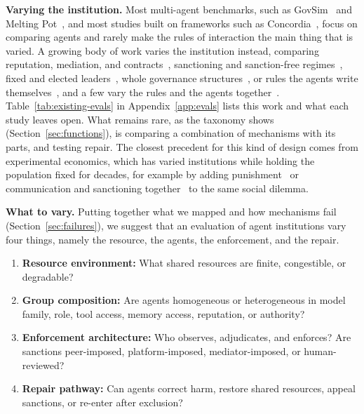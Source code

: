 \documentclass[runningheads]{llncs}
\begin{document}
\textbf{Varying the institution.} Most multi-agent benchmarks, such as GovSim~\mbox{\citep{piatti2024govsim}} and Melting Pot~\mbox{\citep{leibo2021meltingpot}}, and most studies built on frameworks such as Concordia~\mbox{\citep{vezhnevets2023concordia}}, focus on comparing agents and rarely make the rules of interaction the main thing that is varied. A growing body of work varies the institution instead, comparing reputation, mediation, and contracts~\mbox{\citep{tewolde2026coopevalbenchmarkingcooperationsustainingmechanisms}}, sanctioning and sanction-free regimes~\mbox{\citep{piedrahita2025corruptedreasoningreasoninglanguage}}, fixed and elected leaders~\mbox{\citep{faulkner2026evaluatingcooperationllmsocial}}, whole governance structures~\mbox{\citep{vedanta2026corrupt}}, or rules the agents write themselves~\mbox{\citep{rehm2026selfgovernance}}, and a few vary the rules and the agents together~\mbox{\citep{seyedin2026politician}}. Table~\mbox{\ref{tab:existing-evals}} in Appendix~\mbox{\ref{app:evals}} lists this work and what each study leaves open. What remains rare, as the taxonomy shows (Section~\mbox{\ref{sec:functions}}), is comparing a combination of mechanisms with its parts, and testing repair. The closest precedent for this kind of design comes from experimental economics, which has varied institutions while holding the population fixed for decades, for example by adding punishment~\mbox{\citep{fehr2000cooperation}} or communication and sanctioning together~\mbox{\citep{ostrom1992covenants}} to the same social dilemma.

\textbf{What to vary.} Putting together what we mapped and how mechanisms fail (Section~\mbox{\ref{sec:failures}}), we suggest that an evaluation of agent institutions vary four things, namely the resource, the agents, the enforcement, and the repair.

\begin{enumerate}[noitemsep,topsep=1pt,parsep=1pt,partopsep=0pt]
    \item \textbf{Resource environment:} What shared resources are finite, congestible, or degradable?
    \item \textbf{Group composition:} Are agents homogeneous or heterogeneous in model family, role, tool access, memory access, reputation, or authority?
    \item \textbf{Enforcement architecture:} Who observes, adjudicates, and enforces? Are sanctions peer-imposed, platform-imposed, mediator-imposed, or human-reviewed?
    \item \textbf{Repair pathway:} Can agents correct harm, restore shared resources, appeal sanctions, or re-enter after exclusion?
\end{enumerate}
\end{document}
